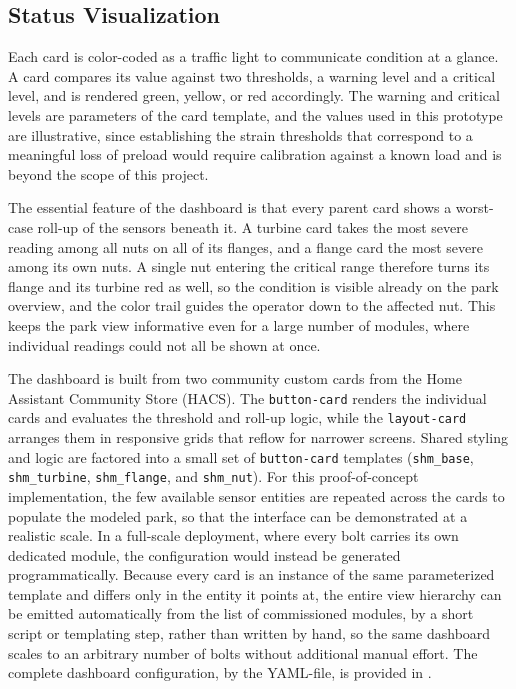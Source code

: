 \subsection{Status Visualization}
Each card is color-coded as a traffic light to communicate condition at a glance. A card compares its value against two thresholds, a warning level and a critical level, and is rendered green, yellow, or red accordingly. The warning and critical levels are parameters of the card template, and the values used in this prototype are illustrative, since establishing the strain thresholds that correspond to a meaningful loss of preload would require calibration against a known load and is beyond the scope of this project.

The essential feature of the dashboard is that every parent card shows a worst-case roll-up of the sensors beneath it. A turbine card takes the most severe reading among all nuts on all of its flanges, and a flange card the most severe among its own nuts. A single nut entering the critical range therefore turns its flange and its turbine red as well, so the condition is visible already on the park overview, and the color trail guides the operator down to the affected nut. This keeps the park view informative even for a large number of modules, where individual readings could not all be shown at once.

The dashboard is built from two community custom cards from the Home Assistant Community Store (HACS). The \texttt{button-card} renders the individual cards and evaluates the threshold and roll-up logic, while the \texttt{layout-card} arranges them in responsive grids that reflow for narrower screens. Shared styling and logic are factored into a small set of \texttt{button-card} templates (\texttt{shm\_base}, \texttt{shm\_turbine}, \texttt{shm\_flange}, and \texttt{shm\_nut}). 
For this proof-of-concept implementation, the few available sensor entities are repeated across the cards to populate the modeled park, so that the interface can be demonstrated at a realistic scale.
In a full-scale deployment, where every bolt carries its own dedicated module, the configuration would instead be generated programmatically. Because every card is an instance of the same parameterized template and differs only in the entity it points at, the entire view hierarchy can be emitted automatically from the list of commissioned modules, by a short script or templating step, rather than written by hand, so the same dashboard scales to an arbitrary number of bolts without additional manual effort.
The complete dashboard configuration, by the YAML-file, is provided in .

